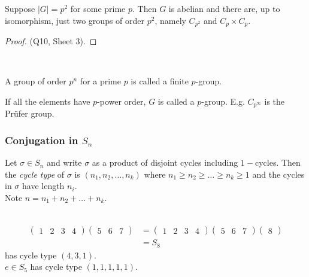 \begin{corollary}\label{cor:5}
    Suppose $|G| = p^2$ for some prime $p$.
    Then $G$ is abelian and there are, up to isomorphism, just two groups of order $p^2$, namely $C_{p^2}$ and $C_p \times C_p$.
\end{corollary}  

\begin{proof}
    (Q10, Sheet 3).
\end{proof} 

\begin{remark} ~
    \item A group of order $p^n$ for a prime $p$ is called a finite $p$-group.
    \item If all the elements have $p$-power order, $G$ is called a $p$-group.
    E.g. $C_{p^\infty}$ is the Pr\"ufer group.
\end{remark} 

\subsubsection{Conjugation in \texorpdfstring{$S_n$}{Sₙ}}

\begin{definition} \label{def:20}
    Let $\sigma \in S_n$ and write $\sigma$ as a product of disjoint cycles including $1-$cycles.
    Then the \emph{cycle type} of $\sigma$ is $(n_1, n_2, \dots, n_k)$ where $n_1 \geq n_2 \geq \dots \geq n_k \geq 1$ and the cycles in $\sigma$ have length $n_i$. \\
    Note $n = n_1 + n_2 + \dots + n_k$.
\end{definition} 

\begin{example} ~\vspace*{-1.5\baselineskip}
    \begin{align*}
        \begin{pmatrix}1 & 2 & 3 & 4\end{pmatrix} \begin{pmatrix}5 & 6 & 7\end{pmatrix} &= \begin{pmatrix}1 & 2 & 3 & 4\end{pmatrix} \begin{pmatrix}5 & 6 & 7\end{pmatrix} \begin{pmatrix}8\end{pmatrix} \\
        &= S_8
    \end{align*}
    has cycle type $(4, 3, 1)$. \\
    $e \in S_5$ has cycle type $(1, 1, 1, 1, 1)$.
\end{example} 

